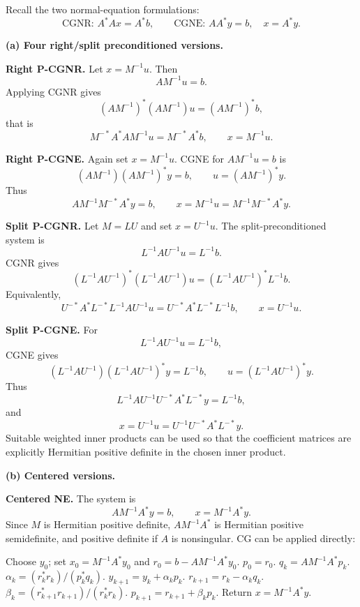 \documentclass{ctexart}
\begin{document}
\begin{solution}
  Recall the two normal-equation formulations:
  \[
    \text{CGNR: } A^*Ax=A^*b,
    \qquad
    \text{CGNE: } AA^*y=b,
    \quad x=A^*y.
  \]

  \medskip
  \noindent\textbf{(a) Four right/split preconditioned versions.}

  \textbf{Right P-CGNR.}
  Let $x=M^{-1}u$.  Then
  \[
    A M^{-1}u=b.
  \]
  Applying CGNR gives
  \[
    (AM^{-1})^*(AM^{-1})u=(AM^{-1})^*b,
  \]
  that is
  \[
    M^{-*}A^*AM^{-1}u=M^{-*}A^*b,
    \qquad x=M^{-1}u.
  \]

  \textbf{Right P-CGNE.}
  Again set $x=M^{-1}u$.  CGNE for $AM^{-1}u=b$ is
  \[
    (AM^{-1})(AM^{-1})^*y=b,
    \qquad u=(AM^{-1})^*y.
  \]
  Thus
  \[
    AM^{-1}M^{-*}A^*y=b,
    \qquad
    x=M^{-1}u=M^{-1}M^{-*}A^*y.
  \]

  \textbf{Split P-CGNR.}
  Let $M=LU$ and set $x=U^{-1}u$.  The split-preconditioned system is
  \[
    L^{-1}AU^{-1}u=L^{-1}b.
  \]
  CGNR gives
  \[
    (L^{-1}AU^{-1})^*(L^{-1}AU^{-1})u
    =(L^{-1}AU^{-1})^*L^{-1}b.
  \]
  Equivalently,
  \[
    U^{-*}A^*L^{-*}L^{-1}AU^{-1}u
    =U^{-*}A^*L^{-*}L^{-1}b,
    \qquad x=U^{-1}u.
  \]

  \textbf{Split P-CGNE.}
  For
  \[
    L^{-1}AU^{-1}u=L^{-1}b,
  \]
  CGNE gives
  \[
    (L^{-1}AU^{-1})(L^{-1}AU^{-1})^*y=L^{-1}b,
    \qquad
    u=(L^{-1}AU^{-1})^*y.
  \]
  Thus
  \[
    L^{-1}AU^{-1}U^{-*}A^*L^{-*}y=L^{-1}b,
  \]
  and
  \[
    x=U^{-1}u
    =U^{-1}U^{-*}A^*L^{-*}y.
  \]
  Suitable weighted inner products can be used so that the coefficient matrices are explicitly Hermitian positive definite in the chosen inner product.

  \medskip
  \noindent\textbf{(b) Centered versions.}

  \textbf{Centered NE.}
  The system is
  \[
    AM^{-1}A^*y=b,
    \qquad
    x=M^{-1}A^*y.
  \]
  Since $M$ is Hermitian positive definite, $AM^{-1}A^*$ is Hermitian positive semidefinite, and positive definite if $A$ is nonsingular.  CG can be applied directly:
  \begin{algorithm}[H]
    \caption{Centered NE-CG}
    \begin{algorithmic}[1]
      \State Choose $y_0$; set $x_0=M^{-1}A^*y_0$ and $r_0=b-AM^{-1}A^*y_0$.
      \State $p_0=r_0$.
      \State $q_k=A M^{-1}A^*p_k$.
      \State $\alpha_k=(r_k^*r_k)/(p_k^*q_k)$.
      \State $y_{k+1}=y_k+\alpha_kp_k$.
      \State $r_{k+1}=r_k-\alpha_kq_k$.
      \State $\beta_k=(r_{k+1}^*r_{k+1})/(r_k^*r_k)$.
      \State $p_{k+1}=r_{k+1}+\beta_kp_k$.
      \EndFor
      \State Return $x=M^{-1}A^*y$.
    \end{algorithmic}
  \end{algorithm}


\end{solution}
\end{document}
